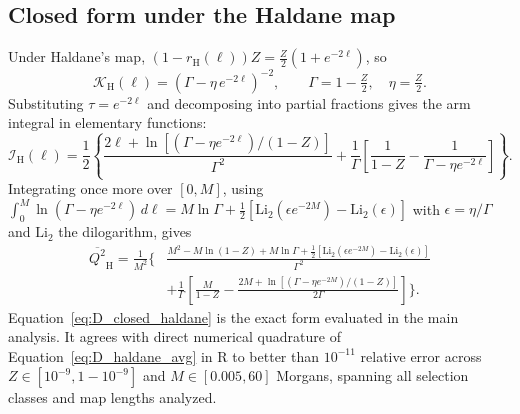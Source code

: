 \documentclass{article}
\begin{document}
\subsection{Closed form under the Haldane map}\label{app:D_closed}
Under Haldane's map, $(1 - r_\text{H}(\ell))Z = \tfrac{Z}{2}(1 + e^{-2\ell})$, so
\begin{equation}
    \mathcal{K}_\text{H}(\ell) = \left(\Gamma - \eta\, e^{-2\ell}\right)^{-2}, \qquad \Gamma = 1 - \tfrac{Z}{2}, \quad \eta = \tfrac{Z}{2}.
\end{equation}
Substituting $\tau = e^{-2\ell}$ and decomposing into partial fractions gives the arm integral in elementary functions:
\begin{equation}
    \mathcal{I}_\text{H}(\ell) = \frac{1}{2}\left\{\frac{2\ell + \ln\!\left[(\Gamma - \eta e^{-2\ell})/(1-Z)\right]}{\Gamma^2} + \frac{1}{\Gamma}\left[\frac{1}{1-Z} - \frac{1}{\Gamma - \eta e^{-2\ell}}\right]\right\}.
\label{eq:D_arm}
\end{equation}
Integrating once more over $[0, M]$, using $\int_0^M \ln(\Gamma - \eta e^{-2\ell})\,d\ell = M\ln \Gamma + \tfrac{1}{2}\left[\mathrm{Li}_2(\epsilon e^{-2M}) - \mathrm{Li}_2(\epsilon)\right]$ with $\epsilon = \eta/\Gamma$ and $\mathrm{Li}_2$ the dilogarithm, gives
\begin{equation}
\begin{split}
    \overline{Q^2}_\text{H} = \frac{1}{M^2}\Bigg\{ &\frac{M^2 - M\ln(1-Z) + M\ln \Gamma + \tfrac{1}{2}\left[\mathrm{Li}_2(\epsilon e^{-2M}) - \mathrm{Li}_2(\epsilon)\right]}{\Gamma^2} \\
    &+ \frac{1}{\Gamma}\left[\frac{M}{1-Z} - \frac{2M + \ln\!\left[(\Gamma-\eta e^{-2M})/(1-Z)\right]}{2\Gamma}\right]\Bigg\}.
\end{split}
\label{eq:D_closed_haldane}
\end{equation}
Equation~\eqref{eq:D_closed_haldane} is the exact form evaluated in the main analysis. It agrees with direct numerical quadrature of Equation~\eqref{eq:D_haldane_avg} in R to better than $10^{-11}$ relative error across $Z \in [10^{-9}, 1 - 10^{-9}]$ and $M \in [0.005, 60]$ Morgans, spanning all selection classes and map lengths analyzed.
\end{document}
